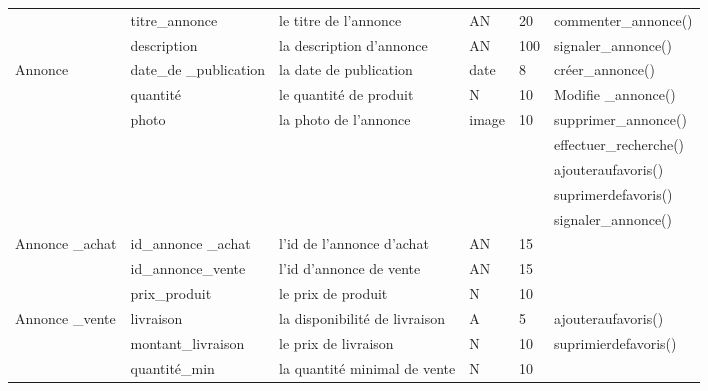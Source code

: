 \documentclass[edit,12pt,a4paper,ChapStyle,oneside,doubleinterligne]{report}
\begin{document}
\begin{table}[H]
\begin{tabular}{ | m{} | m{}| m{3cm} |m{}|m{}|l|}
                                          &titre\_annonce&le titre de l'annonce&AN&20&commenter\_annonce()\\\cline{2-5}
                                          &description&la description d'annonce&AN&100&signaler\_annonce()\\\cline{2-5}
                                Annonce   &date\_de \_publication&la date de publication&date&8&créer\_annonce()\\\cline{2-5}
                                          &quantité&le quantité de produit &N&10&Modifie \_annonce()\\\cline{2-5}
                                          &photo &la photo de l'annonce   &image&10&supprimer\_annonce()\\\cline{2-5}
                                          & &   &&&effectuer\_recherche()\\\cline{2-5}
                                          & &   &&&ajouteraufavoris()\\\cline{2-5}
                                          & &   &&&suprimerdefavoris()\\\cline{2-5}
                                          & &   &&&signaler\_annonce()\\\hline

                        Annonce \_achat   &id\_annonce \_achat &l'id de l'annonce d'achat&AN&15& \\\hline
                                  


                                          &id\_annonce\_vente&l'id d'annonce de vente&AN&15&\\\cline{2-5}
                                          &prix\_produit&le prix de produit&N&10&\\\cline{2-5}
                        Annonce \_vente   &livraison&la disponibilité de livraison&A&5&ajouteraufavoris() \\\cline{2-5}
                                          &montant\_livraison&le prix de livraison&N&10&suprimierdefavoris() \\\cline{2-5}
                                          &quantité\_min&la quantité minimal de vente&N&10& \\\hline


                                                              
          
    \end{tabular}
\end{table}
\end{document}
